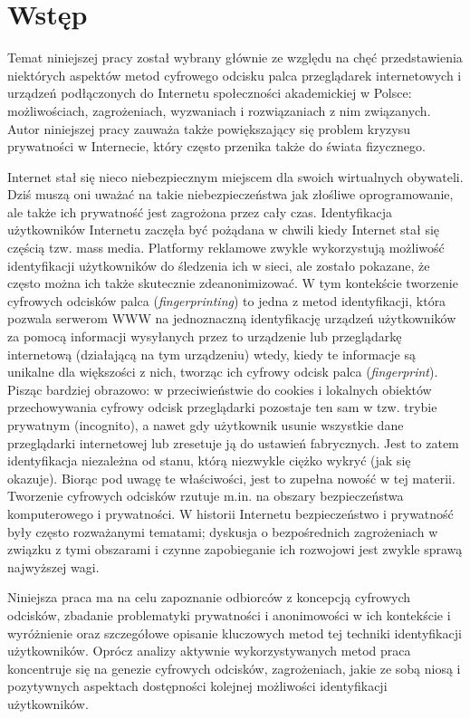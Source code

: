 \chapter*{Wstęp}
Temat niniejszej pracy został wybrany głównie ze względu na chęć przedstawienia
niektórych aspektów metod cyfrowego odcisku palca przeglądarek internetowych i
urządzeń podłączonych do Internetu społeczności akademickiej w Polsce:
możliwościach, zagrożeniach, wyzwaniach i rozwiązaniach z nim związanych. Autor
niniejszej pracy zauważa także powiększający się problem kryzysu prywatności w
Internecie, który często przenika także do świata fizycznego.

Internet stał się nieco niebezpiecznym miejscem dla swoich wirtualnych
obywateli. Dziś muszą oni uważać na takie niebezpieczeństwa jak złośliwe
oprogramowanie, ale także ich prywatność jest zagrożona przez cały czas.
Identyfikacja użytkowników Internetu zaczęła być pożądana w chwili kiedy
Internet stał się częścią tzw. mass media. Platformy reklamowe zwykle
wykorzystują możliwość identyfikacji użytkowników do śledzenia ich w sieci, ale
zostało pokazane, że często można ich także skutecznie zdeanonimizować. W tym
kontekście tworzenie cyfrowych odcisków palca (\emph{fingerprinting}) to jedna z
metod identyfikacji, która pozwala serwerom WWW na jednoznaczną identyfikację
urządzeń użytkowników za pomocą informacji wysyłanych przez to urządzenie lub
przeglądarkę internetową (działającą na tym urządzeniu) wtedy, kiedy te
informacje są unikalne dla większości z nich, tworząc ich cyfrowy odcisk palca
(\emph{fingerprint}). Pisząc bardziej obrazowo: w przeciwieństwie do cookies i
lokalnych obiektów przechowywania cyfrowy odcisk przeglądarki pozostaje ten sam
w tzw. trybie prywatnym (incognito), a nawet gdy użytkownik usunie wszystkie
dane przeglądarki internetowej lub zresetuje ją do ustawień fabrycznych. Jest to
zatem identyfikacja niezależna od stanu, którą niezwykle ciężko wykryć (jak się
okazuje). Biorąc pod uwagę te właściwości, jest to zupełna nowość w tej materii.
Tworzenie cyfrowych odcisków rzutuje m.in. na obszary bezpieczeństwa
komputerowego i prywatności. W historii Internetu bezpieczeństwo i prywatność
były często rozważanymi tematami; dyskusja o bezpośrednich zagrożeniach w
związku z tymi obszarami i czynne zapobieganie ich rozwojowi jest zwykle sprawą
najwyższej wagi.

Niniejsza praca ma na celu zapoznanie odbiorców z koncepcją cyfrowych odcisków,
zbadanie problematyki prywatności i anonimowości w ich kontekście i wyróżnienie
oraz szczegółowe opisanie kluczowych metod tej techniki identyfikacji
użytkowników. Oprócz analizy aktywnie wykorzystywanych metod praca koncentruje
się na genezie cyfrowych odcisków, zagrożeniach, jakie ze sobą niosą i
pozytywnych aspektach dostępności kolejnej możliwości identyfikacji
użytkowników.

